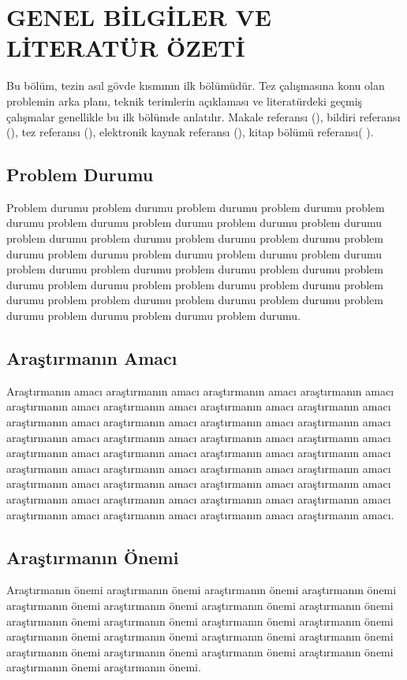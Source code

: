 \chapter{GENEL BİLGİLER VE LİTERATÜR ÖZETİ}

Bu bölüm, tezin asıl gövde kısmının ilk bölümüdür. Tez çalışmasına konu olan problemin arka planı, teknik terimlerin açıklaması ve literatürdeki geçmiş çalışmalar genellikle bu ilk bölümde anlatılır. Makale referansı (\cite{azizoglu2024meld3}), bildiri referansı (\cite{azizoglu2021novel}), tez referansı (\cite{azizoglu2020tersinir}), elektronik kaynak referansı (\cite{azizogluGithub}),  kitap bölümü referansı( \cite{azizoglu2023qr}).

\section{Problem Durumu}
Problem durumu problem durumu problem durumu problem durumu problem durumu problem durumu problem durumu problem durumu problem durumu problem durumu problem durumu problem durumu problem durumu problem durumu problem durumu problem durumu problem durumu problem durumu problem durumu problem durumu problem durumu problem durumu problem durumu problem durumu problem problem durumu problem durumu problem durumu problem problem durumu problem durumu problem durumu problem durumu problem durumu problem durumu problem durumu.

\section{Araştırmanın Amacı}
Araştırmanın amacı araştırmanın amacı araştırmanın amacı araştırmanın amacı araştırmanın amacı araştırmanın amacı araştırmanın amacı araştırmanın amacı araştırmanın amacı araştırmanın amacı araştırmanın amacı araştırmanın amacı araştırmanın amacı araştırmanın amacı araştırmanın amacı araştırmanın amacı araştırmanın amacı araştırmanın amacı araştırmanın amacı araştırmanın amacı araştırmanın amacı araştırmanın amacı araştırmanın amacı araştırmanın amacı araştırmanın amacı araştırmanın amacı araştırmanın amacı araştırmanın amacı araştırmanın amacı araştırmanın amacı araştırmanın amacı araştırmanın amacı araştırmanın amacı araştırmanın amacı araştırmanın amacı araştırmanın amacı.


\section{Araştırmanın Önemi}
Araştırmanın önemi araştırmanın önemi araştırmanın önemi araştırmanın önemi araştırmanın önemi araştırmanın önemi araştırmanın önemi araştırmanın önemi araştırmanın önemi araştırmanın önemi araştırmanın önemi araştırmanın önemi araştırmanın önemi araştırmanın önemi araştırmanın önemi araştırmanın önemi araştırmanın önemi araştırmanın önemi araştırmanın önemi araştırmanın önemi araştırmanın önemi araştırmanın önemi.